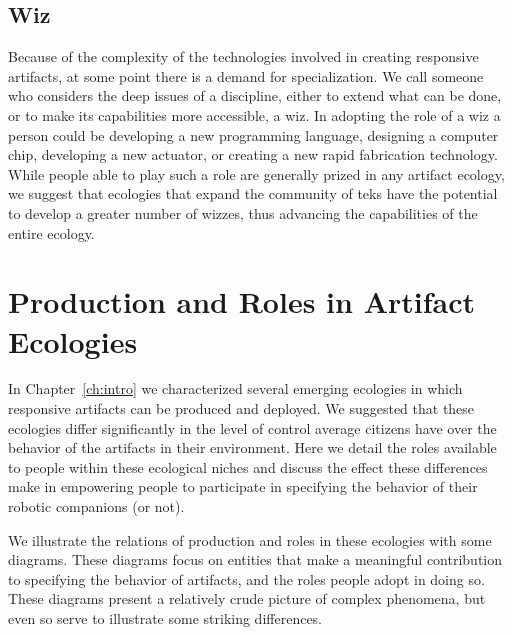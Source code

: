 \subsection{Wiz}
Because of the complexity of the technologies involved in creating responsive artifacts, at some point there is a demand for specialization. 
We call someone who considers the deep issues of a discipline, either to extend what can be done, or to make its capabilities more accessible, a wiz.
In adopting the role of a wiz a person could be developing a new programming language, designing a computer chip, developing a new actuator, or creating a new rapid fabrication technology. 
While people able to play such a role are generally prized in any artifact ecology, we suggest that ecologies that expand the community of teks have the potential to develop a greater number of wizzes, thus advancing the capabilities of the entire ecology.

\section{Production and Roles in Artifact Ecologies}
\label{sec:artifact_ecologies}
%
In Chapter~\ref{ch:intro} we characterized several emerging ecologies in which responsive artifacts can be produced and deployed. We suggested that these ecologies differ significantly in the level of control average citizens have over the behavior of the artifacts in their environment. Here we detail the roles available to people within these ecological niches and discuss the effect these differences make in empowering people to participate in specifying the behavior of their robotic companions (or not).

We illustrate the relations of production and roles in these ecologies with some diagrams. These diagrams focus on entities that make a meaningful contribution to specifying the behavior of artifacts, and the roles people adopt in doing so. These diagrams present a relatively crude picture of complex phenomena, but even so serve to illustrate some striking differences.

